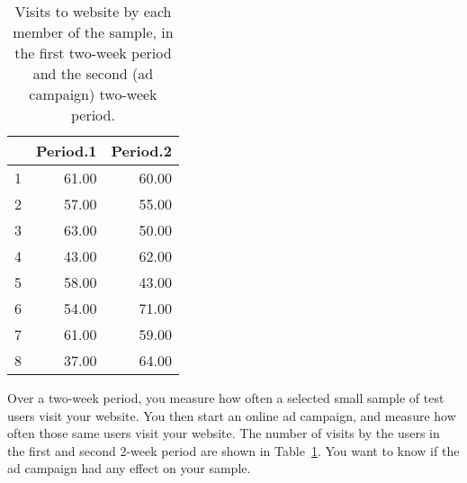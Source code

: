 \documentclass[11pt]{exam}
\begin{document}
\begin{questions}




%
\begin{table}[ht]
\begin{center}
\begin{tabular}{rrr}
  \hline
 & Period.1 & Period.2 \\ 
  \hline
1 & 61.00 & 60.00 \\ 
  2 & 57.00 & 55.00 \\ 
  3 & 63.00 & 50.00 \\ 
  4 & 43.00 & 62.00 \\ 
  5 & 58.00 & 43.00 \\ 
  6 & 54.00 & 71.00 \\ 
  7 & 61.00 & 59.00 \\ 
  8 & 37.00 & 64.00 \\ 
   \hline
\end{tabular}
\caption{Visits to website by
each member of the sample, in the first two-week period and the second (ad
campaign) two-week period.}
\label{tab:adcmpgn}
\end{center}
\end{table}
\question Over a two-week period, you measure how often a selected small
sample of test users visit your website.  You then start an online ad
campaign, and measure how often those same users visit your website.  The
number of visits by the users in the first and second 2-week period are
shown in Table~\ref{tab:adcmpgn}. You want to know if the ad campaign had any
effect on your sample.

\end{questions}
\end{document}
